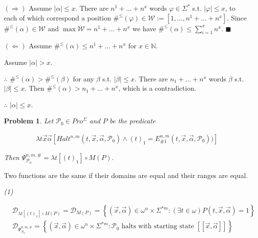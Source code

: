 \documentclass[a4paper, 12pt]{article}
\newtheorem{problem}{Problem}
\newtheorem{problem}{Problem}
\begin{document}
$(\Rightarrow)$ Assume $|\alpha| \leq x$. There are $n^1 + \ldots + n^x$ words
$\varphi \in \Sigma^{*}$ s.t. $|\varphi| \leq x$, to each of which correspond a
position $\#^{\leq}(\varphi) \in \mathscr{W} := [1, \ldots, n^1 + \ldots +
n^x]$. Since $\#^{\leq}(\alpha) \in \mathscr{W}$ and $\max \mathscr{W} = n^1 +
\ldots + n^x$ we have $\#^{\leq}(\alpha) \leq \sum_{i=1}^{x} n^x$. $\blacksquare$

$(\Leftarrow)$ Assume $\#^{\leq}(\alpha) \leq n^1 + \ldots + n^x$ for $x \in
\mathbb{N}$. 

Assume $|\alpha| > x$.  

$\therefore $ $\#^{\leq}(\alpha) >
\#^{\leq}(\beta)$ for any $\beta$ s.t. $|\beta| \leq x$. There are $n_1 + \ldots
+ n^x$ words $\beta$ s.t. $|\beta| \leq x$. Then $\#^{\leq}(\alpha) > n_1 +
\ldots + n^x$, which is a contradiction. 

$\therefore $ $|\alpha| \leq x$.

\pagebreak 

\begin{problem}

    Let $\mathcal{P}_0 \in Pro^{\Sigma}$ and $P$ be the predicate

    \begin{align*}
 \lambda t\vec{x}\vec{\alpha}[Halt^{n,m}\left( t,\vec{x},\vec{\alpha}, \mathcal{P}_{0}\right) \wedge (t)_{1}=E_{\#1}^{n,m}(t,\vec{x},\vec{\alpha}, \mathcal{P}_{0}))]
\end{align*}

Then $\Psi _{\mathcal{P}_{0}}^{n,m,\#}=\lambda t\left[ (t)_{1}\right] \circ
M(P)$.
\end{problem}

Two functions are the same if their domains are equal and their ranges are
equal.

\textit{(1)} 


\begin{align*}
    &\mathcal{D}_{\lambda t \left[  (t)_1 \right] \circ M(P)} =
    \mathcal{D}_{M(P)} = \left\{ (\vec{x}, \vec{\alpha}) \in \omega^{n} \times
    \Sigma^{*m} : (\exists t \in  \omega) P(t, \vec{x}, \vec{\alpha}) = 1
\right\} \\ 
    &\mathcal{D}_{\Psi_{\mathcal{P}_0}^{n, m, \#}} = \left\{ (\vec{x},
\vec{\alpha}) \in \omega^{n} \times \Sigma^{*m} : \mathcal{P}_0 \text{ halts
with starting state } [\![ \vec{x}, \vec{\alpha} ]\!] \right\} 
\end{align*}
\end{document}
